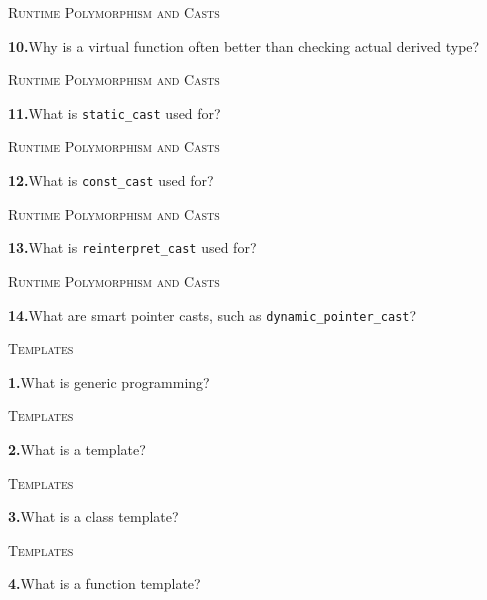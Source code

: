 \documentclass[11pt,a4paper]{article}
\newenvironment{questionblock}{%
  \begin{minipage}[t][0.455\textheight][t]{\textwidth}%
  \raggedright\small
}{%
  \vfill
  \end{minipage}%
}
\newcommand{\sectionlabel}[1]{\textsc{#1}\par\vspace{0.35em}}
\newcommand{\questionnumber}[1]{\textbf{#1.}\enspace}
\begin{document}
\vspace*{0.04\textheight}
\begin{questionblock}
\sectionlabel{Runtime Polymorphism and Casts}
\questionnumber{10}Why is a virtual function often better than checking actual derived type?\par
\end{questionblock}
\newpage
\begin{questionblock}
\sectionlabel{Runtime Polymorphism and Casts}
\questionnumber{11}What is \verb|static_cast| used for?\par
\end{questionblock}
\vspace*{0.04\textheight}
\begin{questionblock}
\sectionlabel{Runtime Polymorphism and Casts}
\questionnumber{12}What is \verb|const_cast| used for?\par
\end{questionblock}
\newpage
\begin{questionblock}
\sectionlabel{Runtime Polymorphism and Casts}
\questionnumber{13}What is \verb|reinterpret_cast| used for?\par
\end{questionblock}
\vspace*{0.04\textheight}
\begin{questionblock}
\sectionlabel{Runtime Polymorphism and Casts}
\questionnumber{14}What are smart pointer casts, such as \verb|dynamic_pointer_cast|?\par

\end{questionblock}
\newpage
\begin{questionblock}
\sectionlabel{Templates}
\questionnumber{1}What is generic programming?\par
\end{questionblock}
\vspace*{0.04\textheight}
\begin{questionblock}
\sectionlabel{Templates}
\questionnumber{2}What is a template?\par
\end{questionblock}
\newpage
\begin{questionblock}
\sectionlabel{Templates}
\questionnumber{3}What is a class template?\par
\end{questionblock}
\vspace*{0.04\textheight}
\begin{questionblock}
\sectionlabel{Templates}
\questionnumber{4}What is a function template?\par
\end{questionblock}
\end{document}
